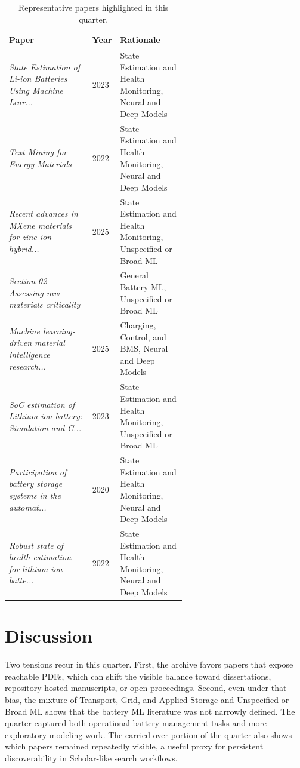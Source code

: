 \documentclass[conference]{IEEEtran}
\begin{document}
\begin{table}[t]
\caption{Representative papers highlighted in this quarter.}
\label{tab:notable}
\centering
\footnotesize
\begin{tabularx}{\linewidth}{p{0.47\linewidth} p{0.12\linewidth} X}
\toprule
Paper & Year & Rationale \\
\midrule
\textit{State Estimation of Li-ion Batteries Using Machine Lear...} \cite{stateestimationof2023} & 2023 & State Estimation and Health Monitoring, Neural and Deep Models \\
\textit{Text Mining for Energy Materials} \cite{textminingfor2022} & 2022 & State Estimation and Health Monitoring, Neural and Deep Models \\
\textit{Recent advances in MXene materials for zinc-ion hybrid...} \cite{recentadvancesin2025} & 2025 & State Estimation and Health Monitoring, Unspecified or Broad ML \\
\textit{Section 02-Assessing raw materials criticality} \cite{section02assessingna} & -- & General Battery ML, Unspecified or Broad ML \\
\textit{Machine learning-driven material intelligence research...} \cite{machinelearningdriven2025} & 2025 & Charging, Control, and BMS, Neural and Deep Models \\
\textit{SoC estimation of Lithium-ion battery: Simulation and C...} \cite{socestimationof2023} & 2023 & State Estimation and Health Monitoring, Unspecified or Broad ML \\
\textit{Participation of battery storage systems in the automat...} \cite{participationofbattery2020} & 2020 & State Estimation and Health Monitoring, Neural and Deep Models \\
\textit{Robust state of health estimation for lithium-ion batte...} \cite{robuststateof2022} & 2022 & State Estimation and Health Monitoring, Neural and Deep Models \\
\bottomrule
\end{tabularx}
\end{table}

\section{Discussion}
Two tensions recur in this quarter. First, the archive favors papers that expose reachable PDFs, which can shift the visible balance toward dissertations, repository-hosted manuscripts, or open proceedings. Second, even under that bias, the mixture of Transport, Grid, and Applied Storage and Unspecified or Broad ML shows that the battery ML literature was not narrowly defined. The quarter captured both operational battery management tasks and more exploratory modeling work. The carried-over portion of the quarter also shows which papers remained repeatedly visible, a useful proxy for persistent discoverability in Scholar-like search workflows.
\end{document}
